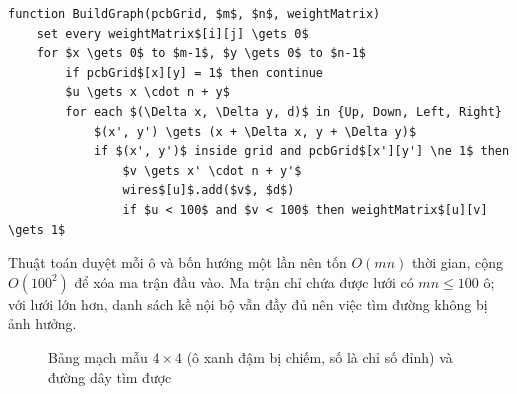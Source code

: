 \begin{lstlisting}[style=gia, caption={Biến đổi lưới PCB thành ma trận trọng số}, label={lst:t5-bien-doi}]
function BuildGraph(pcbGrid, $m$, $n$, weightMatrix)
    set every weightMatrix$[i][j] \gets 0$
    for $x \gets 0$ to $m-1$, $y \gets 0$ to $n-1$
        if pcbGrid$[x][y] = 1$ then continue
        $u \gets x \cdot n + y$
        for each $(\Delta x, \Delta y, d)$ in {Up, Down, Left, Right}
            $(x', y') \gets (x + \Delta x, y + \Delta y)$
            if $(x', y')$ inside grid and pcbGrid$[x'][y'] \ne 1$ then
                $v \gets x' \cdot n + y'$
                wires$[u]$.add($v$, $d$)
                if $u < 100$ and $v < 100$ then weightMatrix$[u][v] \gets 1$
\end{lstlisting}

Thuật toán duyệt mỗi ô và bốn hướng một lần nên tốn $O(mn)$ thời gian, cộng $O(100^2)$ để xóa
ma trận đầu vào. Ma trận  chỉ chứa được lưới có $mn \le 100$ ô; với lưới
lớn hơn, danh sách kề nội bộ  vẫn đầy đủ nên việc tìm đường không bị ảnh hưởng.

\begin{figure}[H]
  \centering
  \caption{Bảng mạch mẫu $4 \times 4$ (ô xanh đậm bị chiếm, số là chỉ số đỉnh) và đường dây tìm được}
  \label{fig:t5-luoi}
\end{figure}

